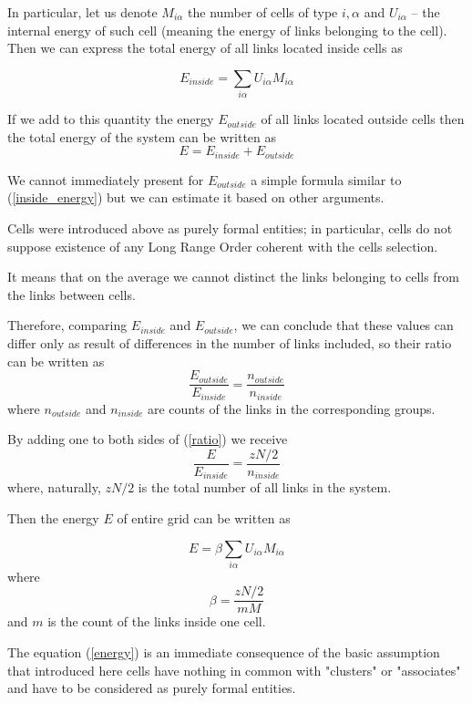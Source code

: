 \documentclass[12pt,abstract]{scrartcl}
\begin{document}
In particular, let us denote  \( M_{i \alpha}\) the number of cells of type  \(  i, \alpha \)  and  \( U_{i \alpha} \) -- the internal energy of such cell (meaning the energy of links belonging to the cell).
Then we can express the total energy of all  links located inside  cells as

\begin{equation} \label{inside_energy}
E_{inside} = \sum_{i\alpha} U_{i \alpha} M_{i \alpha}
\end{equation} 

If we add to this quantity the energy $E_{outside}$ of all links located outside cells then the total energy of the system can be written as
\begin{equation} \label{energy2}
E = E_{inside} + E_{outside} 
\end{equation}

We cannot immediately present for $ E_{outside}$ a simple formula similar to (\ref{inside_energy}) but we can estimate it based on other arguments.

Cells were introduced above as purely formal entities; in particular, cells do not suppose existence of any Long  Range Order coherent with the cells selection.


It means that on the average we cannot distinct the links belonging to cells from the links between cells.

Therefore, comparing  $E_{inside}$ and $ E_{outside}$, we can conclude that these values can differ only as result of differences in the number of links  included, so   their ratio can be written as
\begin{equation} \label{ratio}
\frac{E_{outside}}{E_{inside}} = \frac{n_{outside}}{n_{inside}} 
\end{equation}
where $n_{outside}$ and ${n_{inside}}$ are counts of the links in the corresponding groups.

By adding one to both sides of (\ref{ratio}) we receive
\[
\frac{E}{E_{inside}} = \frac{z N / 2}{n_{inside}}
\]
where, naturally, $zN/2$ is the  total number of all links in the system.

Then the energy $E$ of entire grid can be written as


\begin{equation} \label{energy}
E = \beta\sum_{i\alpha} U_{i \alpha} M_{i \alpha}
\end{equation} 
where  
\[
\beta = \frac{z N / 2}{m M}
\]
and $m$ is the count of the links inside one cell.


The equation (\ref{energy}) is an immediate consequence of the basic assumption that introduced here cells have nothing in common with "clusters" or "associates" and have to be considered as purely formal entities.
\end{document}
